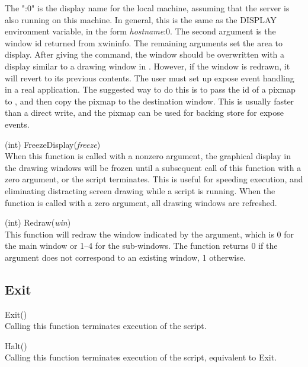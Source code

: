 \begin{description}
The {\vt ":0"} is the display name for the local machine, assuming
that the {\Xic} server is also running on this machine.  In general,
this is the same as the {\et DISPLAY} environment variable, in the
form {\it hostname\/}{\vt :0}.  The second argument is the window id
returned from {\et xwininfo}.  The remaining arguments set the area to
display.  After giving the command, the window should be overwritten
with a display similar to a drawing window in {\Xic}.  However, if the
window is redrawn, it will revert to its previous contents.  The user
must set up expose event handling in a real application.  The
suggested way to do this is to pass the id of a pixmap to {\Xic}, and
then copy the pixmap to the destination window.  This is usually
faster than a direct write, and the pixmap can be used for backing
store for expose events.

\item{(int) \vt FreezeDisplay({\it freeze\/})}\\
When this function is called with a nonzero argument, the graphical
display in the drawing windows will be frozen until a subsequent call
of this function with a zero argument, or the script terminates.  This
is useful for speeding execution, and eliminating distracting screen
drawing while a script is running.  When the function is called with a
zero argument, all drawing windows are refreshed.

\item{(int) \vt Redraw({\it win\/})}\\
This function will redraw the window indicated by the argument, which
is 0 for the main window or 1--4 for the sub-windows.  The function
returns 0 if the argument does not correspond to an existing window, 1
otherwise.

\end{description}


\subsection{Exit}

\begin{description}
\item{\vt Exit()}\\
Calling this function terminates execution of the script.

\item{\vt Halt()}\\
Calling this function terminates execution of the script, equivalent
to {\vt Exit}.

\end{description}


